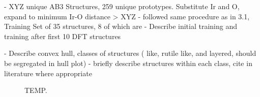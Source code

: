 
- XYZ unique AB3 Structures, 259 unique prototypes.  Substitute Ir and O, expand to minimum Ir-O distance > XYZ
- followed same procedure as in 3.1, Training Set of 35 structures, 8 of which are 
- Describe initial training and training after first 10 DFT structures

- Describe convex hull, classes of structures ( like, rutile like, and layered, should be segregated in hull plot)
- briefly describe structures within each class, cite in literature where appropriate

\begin{figure}
\centering
{}

\caption{\label{fig:convergence_plot_iro3_0}
  TEMP.
  }
\end{figure}
